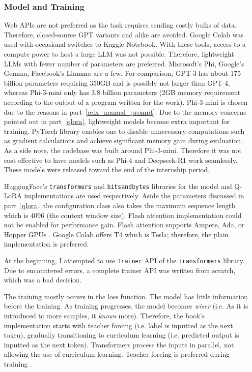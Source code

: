 \documentclass{article}
\begin{document}
\subsubsection{Model and Training}
Web APIs are not preferred as the task requires sending costly bulks of data. Therefore, closed-source GPT variants and alike are avoided. Google Colab was used with occasional switches to Kaggle Notebook. With these tools, access to a compute power to host a large LLM was not possible. Therefore, lightweight LLMs with fewer number of parameters are preferred. Microsoft's Phi, Google's Gemma, Facebook's Llamma are a few. For comparison, GPT-3 has about 175 billion parameters requiring 350GB \cite{brown_language_2020} and is possibly not larger than GPT-4, whereas Phi-3-mini only has 3.8 billion parameters \cite{abdin_phi-3_2024} (2GB memory requirement according to the output of a program written for the work). Phi-3-mini is chosen due to the reasons in part~\ref{relx_manual_prompt}. Due to the memory concerns pointed out in part~\ref{qlora}, lightweight models become extra important for training. PyTorch library enables one to disable unnecessary computations such as gradient calculations and achieve significant memory gain during evaluation. As a side note, the codebase was built around Phi-3-mini. Therefore it was not cost effective to have models such as Phi-4 and Deepseek-R1 work seamlessly. These models were released toward the end of the internship period. 

HuggingFace's \texttt{transformers} and \texttt{bitsandbytes} libraries for the model and Q-LoRA implementations are used respectively. Aside the parameters discussed in part~\ref{qlora}, the configuration class also takes the maximum sequence length which is 4096 (the context window size). Flash attention implementation could not be enabled for performance gain. Flash attention supports Ampere, Ada, or Hopper GPUs \cite{dao-ailab_github_2022}. Google Colab offers T4 which is Tesla; therefore, the plain implementation is preferred.

At the beginning, I attempted to use \texttt{Trainer} API of the \texttt{transformers} library. Due to encountered errors, a complete trainer API was written from scratch, which was a bad decision.

The training mostly occurs in the loss function. The model has little information before the training. As training progresses, the model becomes \textit{wiser} (i.e. As it is introduced to more samples, it \textit{knows} more). Therefore, the book's implementation starts with teacher forcing (i.e. label is inputted as the next token), gradually transitioning to curriculum learning (i.e. predicted output is inputted as the next token). Transformers process the inputs in parallel, not allowing the use of curriculum learning. Teacher forcing is preferred during training \cite{lapan_deep_2020}.
\end{document}
